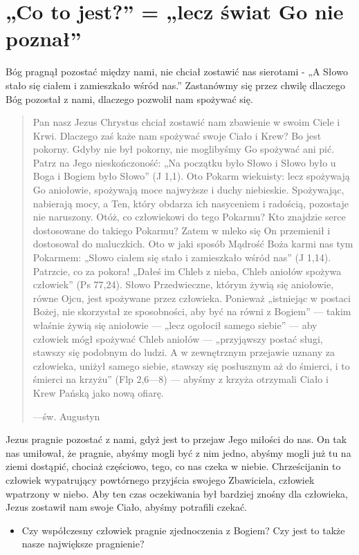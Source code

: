 \documentclass[a5paper,10pt,polish]{book}
\begin{document}
\section{„Co to jest?” = „lecz świat Go nie poznał”}
\label{babice2006-jesien-knurow/spotkanie2:co-to-jest-lecz-swiat-go-nie-poznal}
Bóg pragnął pozostać między nami, nie chciał zostawić nas sierotami - „A Słowo stało się ciałem i zamieszkało wśród nas.” Zastanówmy się przez chwilę dlaczego Bóg pozostał z nami, dlaczego pozwolił nam spożywać się.
\begin{quote}

Pan nasz Jezus Chrystus chciał zostawić nam zbawienie w swoim Ciele i Krwi. Dlaczego zaś każe nam spożywać swoje Ciało i Krew? Bo jest pokorny. Gdyby nie był pokorny, nie moglibyśmy Go spożywać ani pić. Patrz na Jego nieskończoność: „Na początku było Słowo i Słowo było u Boga i Bogiem było Słowo” (J 1,1). Oto Pokarm wiekuisty: lecz spożywają Go aniołowie, spożywają moce najwyższe i duchy niebieskie. Spożywając, nabierają mocy, a Ten, który obdarza ich nasyceniem i radością, pozostaje nie naruszony. Otóż, co człowiekowi do tego Pokarmu? Kto znajdzie serce dostosowane do takiego Pokarmu? Zatem w mleko się On przemienił i dostosował do maluczkich. Oto w jaki sposób Mądrość Boża karmi nas tym Pokarmem: „Słowo ciałem się stało i zamieszkało wśród nas” (J 1,14). Patrzcie, co za pokora! „Dałeś im Chleb z nieba, Chleb aniołów spożywa człowiek” (Ps 77,24). Słowo Przedwieczne, którym żywią się aniołowie, równe Ojcu, jest spożywane przez człowieka. Ponieważ „istniejąc w postaci Bożej, nie skorzystał ze sposobności, aby być na równi z Bogiem” — takim właśnie żywią się aniołowie — „lecz ogołocił samego siebie” — aby człowiek mógł spożywać Chleb aniołów — „przyjąwszy postać sługi, stawszy się podobnym do ludzi. A w zewnętrznym przejawie uznany za człowieka, uniżył samego siebie, stawszy się posłusznym aż do śmierci, i to śmierci na krzyżu” (Flp 2,6—8) — abyśmy z krzyża otrzymali Ciało i Krew Pańską jako nową ofiarę.

\begin{flushright}
---św. Augustyn
\end{flushright}
\end{quote}

Jezus pragnie pozostać z nami, gdyż jest to przejaw Jego miłości do nas. On tak nas umiłował, że pragnie, abyśmy mogli być z nim jedno, abyśmy mogli już tu na ziemi dostąpić, chociaż częściowo, tego, co nas czeka w niebie. Chrześcijanin to człowiek wypatrujący powtórnego przyjścia swojego Zbawiciela, człowiek wpatrzony w niebo. Aby ten czas oczekiwania był bardziej znośny dla człowieka, Jezus zostawił nam swoje Ciało, abyśmy potrafili czekać.
\begin{itemize}
\item {} 
Czy współczesny człowiek pragnie zjednoczenia z Bogiem? Czy jest to także nasze największe pragnienie?

\end{itemize}
\end{document}
